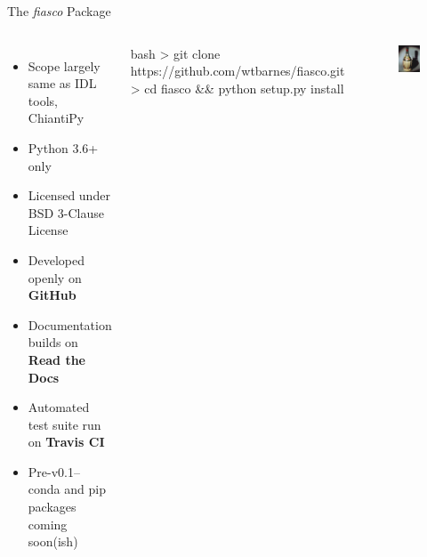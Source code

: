 \documentclass[12pt,aspectratio=169]{beamer}
\begin{document}
\begin{frame}[fragile]{The \emph{fiasco} Package}
\begin{columns}
        \begin{itemize}
            \item Scope largely same as IDL tools, ChiantiPy
            \item \alert{Python 3.6+ only}
            \item Licensed under BSD 3-Clause License
            \item Developed openly on \textbf{GitHub}
            \item Documentation builds on \textbf{Read the Docs}
            \item Automated test suite run on \textbf{Travis CI}
            \item Pre-v0.1--conda and pip packages coming soon(ish)
        \end{itemize}
        {\footnotesize
        \begin{pygments}{bash}
> git clone https://github.com/wtbarnes/fiasco.git
> cd fiasco && python setup.py install 
        \end{pygments}
        }
        \begin{figure}
            \centering
            \includegraphics[width=\columnwidth]{../figures/chianti_bottle}
            \caption{}
        \end{figure}
\end{columns}
\end{frame}
\end{document}
